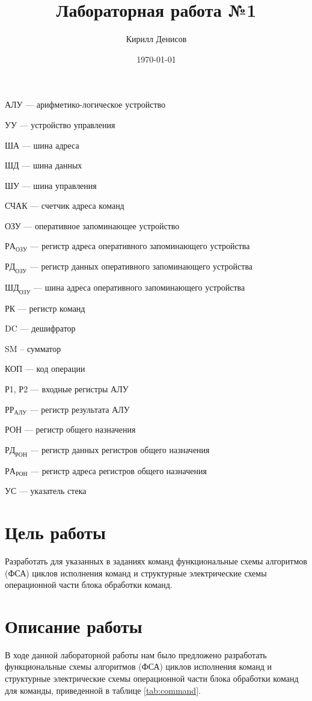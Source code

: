 \documentclass[a4paper,14pt]{extarticle}
\author{Кирилл Денисов}
\title{Лабораторная работа №1}
\date{\today}
\newcommand{\pathToCommonFolder}{/home/denilai/Documents/repos/latex/Common}
\begin{document}
%	
\setcounter{page}{2}
	
	\section*{}	
	АЛУ --- арифметико-логическое устройство
	
	УУ --- устройство управления
	
	ША --- шина адреса
	
	ШД --- шина данных
	
	ШУ --- шина управления
	
	СЧАК --- счетчик адреса команд
	
	ОЗУ  --- оперативное запоминающее устройство
	
	$РА_{ОЗУ}$ --- регистр адреса оперативного запоминающего устройства
	
	$РД_{ОЗУ}$ --- регистр данных оперативного запоминающего устройства
	
	$ШД_{ОЗУ}$ --- шина адреса оперативного запоминающего устройства
	
	РК  --- регистр команд
	
	
	DC  --- дешифратор
	
	SM -- сумматор
	
	КОП --- код операции
	
	Р1, Р2 --- входные регистры АЛУ
	
	$РР_{АЛУ}$ --- регистр результата АЛУ
	
	РОН --- регистр общего назначения
	
	
	$РД_{РОН}$  --- регистр данных регистров общего назначения
	
	$РА_{РОН}$  --- регистр адреса регистров общего назначения
	
	УС --- указатель стека
	
\newpage
\section*{Цель работы}
Разработать для указанных в заданиях команд функциональные схемы
алгоритмов (ФСА) циклов исполнения команд и структурные электрические
схемы операционной части блока обработки команд.
\section*{Описание работы}
В ходе данной лабораторной работы нам было предложено разработать
функциональные схемы алгоритмов (ФСА) циклов исполнения команд и
структурные электрические схемы операционной части блока обработки команд для команды, приведенной в таблице \ref{tab:command}.
\end{document}

